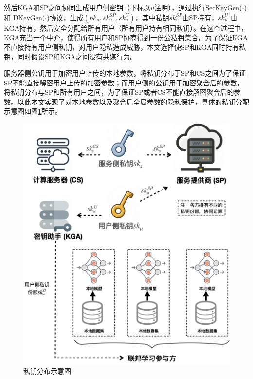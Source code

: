 然后KGA和SP之间协同生成用户侧密钥（下标以$ u $注明），通过执行SecKeyGen($\cdot$) 和 DKeyGen($\cdot$)协议，生成$(pk_u, sk_{u}^{SP}, sk_{u}^{U})$，其中私钥$ sk_{u}^{SP} $由SP持有，$ sk_{u}^{U} $ 由KGA持有，然后安全分配给所有用户（所有用户持有相同私钥）。在这个过程中，KGA充当一个中介，使得所有用户和SP协商得到一份公私钥集合，为了保证KGA不直接持有用户侧私钥，对用户隐私造成威胁，本文选择使SP和KGA同时持有私钥，同时假设SP和KGA之间没有共谋行为。

服务器侧公钥用于加密用户上传的本地参数，将私钥分布于SP和CS之间为了保证SP不能直接解密用户上传的加密参数；而用户侧的公钥用于加密聚合后的参数，将私钥分布与SP和所有用户之间，为了保证SP或者CS不能直接解密聚合后的参数。以此本文实现了对本地参数以及聚合后全局参数的隐私保护，具体的私钥分配示意图如图\ref{keypng}所示。

\begin{figure}[htbp]
	\begin{center}
		\includegraphics[width=0.5\linewidth]{figures/keynote-figs/Key-分配.png}
		\caption{私钥分布示意图}
		\label{keypng}
	\end{center}
\end{figure}

